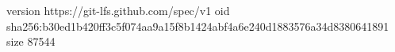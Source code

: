 version https://git-lfs.github.com/spec/v1
oid sha256:b30ed1b420ff3c5f074aa9a15f8b1424abf4a6e240d1883576a34d8380641891
size 87544
